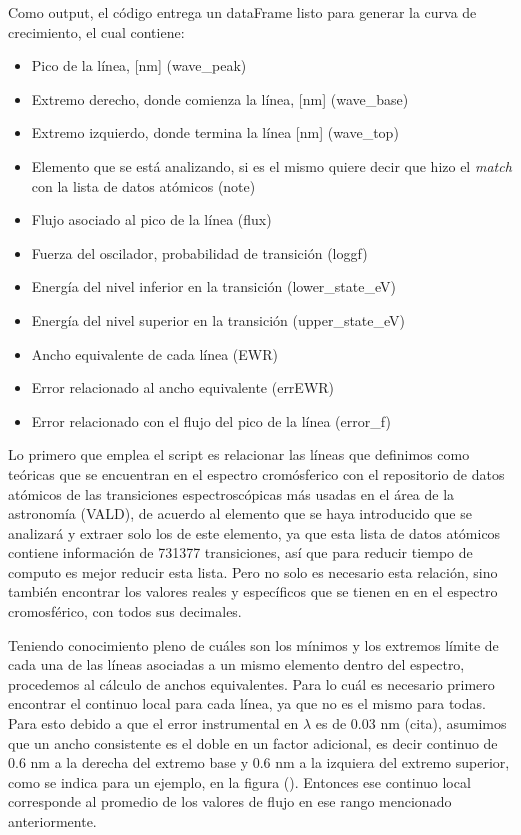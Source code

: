 \documentclass[12pt,oneside,openany,letter]{book}
\begin{document}
Como output, el código entrega un dataFrame listo para generar la curva de crecimiento, el cual contiene:
\begin{itemize}
    \item Pico de la línea, [nm] (wave\_peak)
    \item Extremo derecho, donde comienza la línea, [nm] (wave\_base)
    \item Extremo izquierdo, donde termina la línea [nm] (wave\_top)
    \item Elemento que se está analizando, si es el mismo quiere decir que hizo el \textit{match} con la lista de datos atómicos (note)
    \item Flujo asociado al pico de la línea (flux)
    \item Fuerza del oscilador, probabilidad de transición (loggf)
    \item Energía del nivel inferior en la transición (lower\_state\_eV)
    \item Energía del nivel superior en la transición (upper\_state\_eV)
    \item Ancho equivalente de cada línea (EWR)
    \item Error relacionado al ancho equivalente (errEWR)
    \item Error relacionado con el flujo del pico de la línea (error\_f)
\end{itemize}

Lo primero que emplea el script es relacionar las líneas que definimos como teóricas que se encuentran en el espectro cromósferico con el repositorio de datos atómicos de las transiciones espectroscópicas más usadas en el área de la astronomía (VALD), de acuerdo al elemento que se haya introducido que se analizará y extraer solo los de este elemento, ya que esta lista de datos atómicos contiene información de 731377 transiciones, así que para reducir tiempo de computo es mejor reducir esta lista. Pero no solo es necesario esta relación, sino también encontrar los valores reales y específicos que se tienen en en el espectro cromosférico, con todos sus decimales.

Teniendo conocimiento pleno de cuáles son los mínimos y los extremos límite de cada una de las líneas asociadas a un mismo elemento dentro del espectro, procedemos al cálculo de anchos equivalentes. Para lo cuál es necesario primero encontrar el continuo local para cada línea, ya que no es el mismo para todas. Para esto debido a que el error instrumental en $\lambda$ es de 0.03 nm (cita), asumimos que un ancho consistente es el doble en un factor adicional, es decir continuo de 0.6 nm a la derecha del extremo base y 0.6 nm a la izquiera del extremo superior, como se indica para un ejemplo, en la figura (). Entonces ese continuo local corresponde al promedio de los valores de flujo en ese rango mencionado anteriormente.
\end{document}
